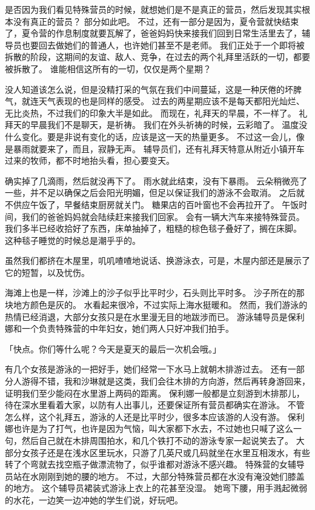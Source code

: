 \documentclass[UTF8]{ctexart}
\begin{document}
是否因为我们看见特殊营员的时候，就想她们是不是真正的营员，然后发现其实根本没有真正的营员？
部分如此吧。
不过，还有一部分是因为，夏令营就快结束了，夏令营的作息制度就要瓦解了，爸爸妈妈快来接我们回到日常生活里去了，辅导员也要回去做她们的普通人，也许她们甚至不是老师。
我们正处于一个即将被拆散的阶段，这期间的友谊、敌人、竞争，在过去的两个礼拜里活跃的一切，都要被拆散了。
谁能相信这所有的一切，仅仅是两个星期？

没人知道该怎么说，但是没精打采的气氛在我们中间蔓延，这是一种厌倦的坏脾气，就连天气表现的也是同样的感受。
过去的两星期应该不是每天都阳光灿烂、无比炎热，不过我们的印象大半是如此。
而现在，礼拜天的早晨，不一样了。
礼拜天的早晨我们不是聊天，是祈祷。
我们在外头祈祷的时候，云彩暗了。
温度没什么变化。要是非说有变化的话，应该是这一天的热量更多。
不过这一会儿，像是暴雨就要来了，而且，寂静无声。
辅导员们，还有礼拜天特意从附近小镇开车过来的牧师，都不时地抬头看，担心要变天。

确实掉了几滴雨，然后就没再下了。
雨水就此结束，没有下暴雨。
云朵稍微亮了一些，并不足以确保之后会阳光明媚，但足以保证我们的游泳不会取消。
之后就不供应午饭了，早餐结束厨房就关门。
糖果店的百叶窗也不会再拉开了。
午饭时间，我们的爸爸妈妈就会陆续赶来接我们回家。
会有一辆大汽车来接特殊营员。
我们多半已经收拾好了东西，床单抽掉了，粗糙的棕色毯子叠好了，搁在床脚。
这种毯子睡觉的时候总是潮乎乎的。

虽然我们都挤在木屋里，叽叽喳喳地说话、换游泳衣，可是，木屋内部还是展示了它的短暂，以及忧伤。

海滩上也是一样，沙滩上的沙子似乎比平时少，石头则比平时多。
沙子所在的那块地方颜色是灰的。
水看起来很冷，不过实际上海水挺暖和。
然而，我们游泳的热情已经消退，大部分女孩只是在水里漫无目的地跋涉而已。
游泳辅导员是保利娜和一个负责特殊营的中年妇女，她们两人只好冲我们拍手。

「快点。你们等什么呢？今天是夏天的最后一次机会哦。」

有几个女孩是游泳的一把好手，她们经常一下水马上就朝木排游过去。
还有一部分人游得不错，我和沙琳就是这类，我们会往木排的方向游，然后再转身游回来，证明我们至少能闷在水里游上两码的距离。
保利娜一般都是立刻游到木排那儿，待在深水里看着大家，以防有人出事儿，还要保证所有营员都确实在游泳。
不管怎么样，这个礼拜五，游泳的人还是比平时少，很多本应该游的人没有游。
保利娜也许是为了打气，也许是因为气恼，叫大家都下水去，不过她也只喊了这么一句，然后自己就在木排周围拍水，和几个铁打不动的游泳专家一起说笑去了。
大部分女孩子还是在浅水区里玩水，只游了几英尺或几码就坐在水里互相泼水，有些转了个弯就去找空瓶子做漂流物了，似乎谁都对游泳不感兴趣。
特殊营的女辅导员站在水刚刚到她的腰的地方。
不过，大部分特殊营员都在水没有淹没她们膝盖的地方。
这个辅导员裙装式游泳上衣上的花甚至没湿。
她弯下腰，用手溅起微弱的水花，一边笑一边冲她的学生们说，好玩吧。
\end{document}
